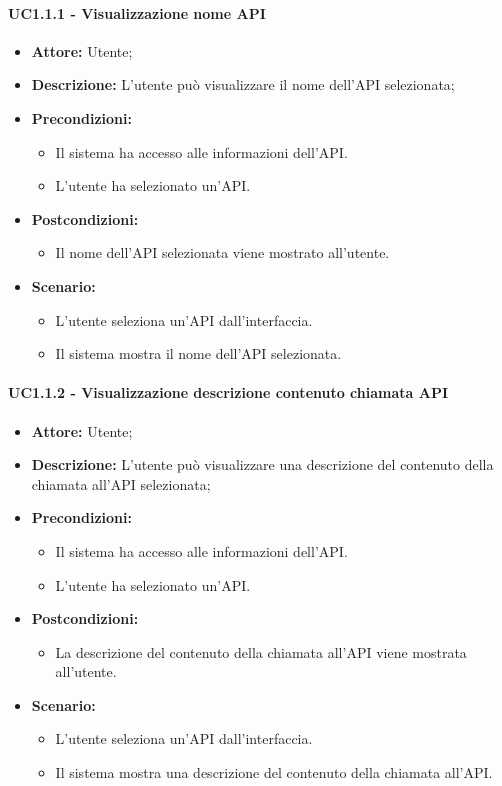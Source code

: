 \paragraph{UC1.1.1 - Visualizzazione nome API}
\begin{itemize}
    \item \textbf{Attore:} Utente;
    \item \textbf{Descrizione:} L'utente può visualizzare il nome dell'API selezionata;
    \item \textbf{Precondizioni:}
    \begin{itemize}
        \item Il sistema ha accesso alle informazioni dell'API.
        \item L'utente ha selezionato un'API.
    \end{itemize}
    \item \textbf{Postcondizioni:}
    \begin{itemize}
        \item Il nome dell'API selezionata viene mostrato all'utente.
    \end{itemize}
    \item \textbf{Scenario:}
    \begin{itemize}
        \item L'utente seleziona un'API dall'interfaccia.
        \item Il sistema mostra il nome dell'API selezionata.
    \end{itemize}
\end{itemize}
\paragraph{UC1.1.2 - Visualizzazione descrizione contenuto chiamata API}
\begin{itemize}
    \item \textbf{Attore:} Utente;
    \item \textbf{Descrizione:} L'utente può visualizzare una descrizione del contenuto della chiamata all'API selezionata;
    \item \textbf{Precondizioni:}
    \begin{itemize}
        \item Il sistema ha accesso alle informazioni dell'API.
        \item L'utente ha selezionato un'API.
    \end{itemize}
    \item \textbf{Postcondizioni:}
    \begin{itemize}
        \item La descrizione del contenuto della chiamata all'API viene mostrata all'utente.
    \end{itemize}
    \item \textbf{Scenario:}
    \begin{itemize}
        \item L'utente seleziona un'API dall'interfaccia.
        \item Il sistema mostra una descrizione del contenuto della chiamata all'API.
    \end{itemize}
\end{itemize}

